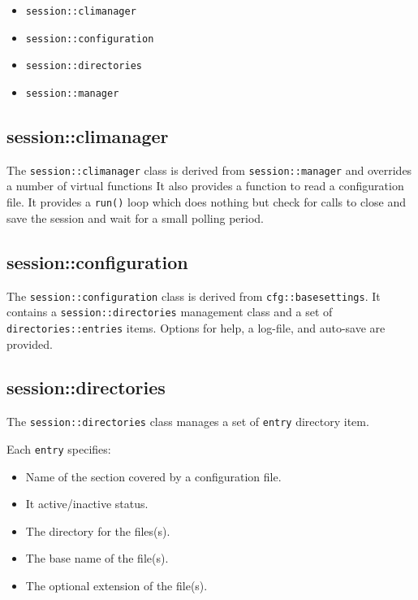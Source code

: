    \begin{itemize}
      \item \texttt{session::climanager}
      \item \texttt{session::configuration}
      \item \texttt{session::directories}
      \item \texttt{session::manager}
   \end{itemize}

\subsection{session::climanager}
\label{subsec:session_namespace_climanager}

   The \texttt{session::climanager} class is derived from
   \texttt{session::manager} and overrides a number of virtual functions
   It also provides a function to read a configuration file.
   It provides a \texttt{run()} loop which does nothing
   but check for calls to close and save the session and wait for a small
   polling period.

\subsection{session::configuration}
\label{subsec:session_namespace_configuration}

   The \texttt{session::configuration} class is derived from
   \texttt{cfg::basesettings}.
   It contains a \texttt{session::directories} management class
   and a set of
   \texttt{directories::entries} items.
   Options for help, a log-file, and auto-save are provided.

\subsection{session::directories}
\label{subsec:session_namespace_directories}

   The \texttt{session::directories} class manages a set of
   \texttt{entry} directory item.

   Each \texttt{entry} specifies:

   \begin{itemize}
      \item Name of the section covered by a configuration file.
      \item It active/inactive status.
      \item The directory for the files(s).
      \item The base name of the file(s).
      \item The optional extension of the file(s).
   \end{itemize}

